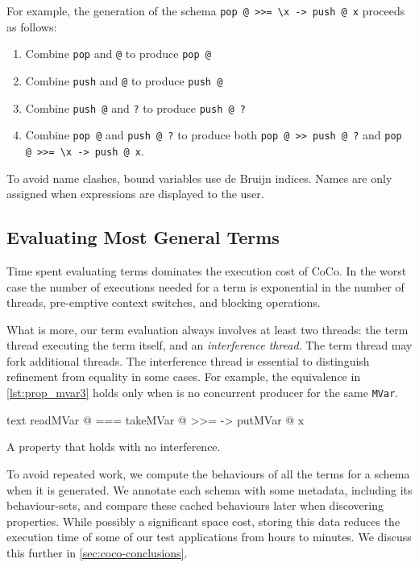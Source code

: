 For example, the generation of the schema
\verb|pop @ >>= \x -> push @ x| proceeds as follows:

\begin{enumerate}
\item Combine \verb|pop| and \verb|@| to produce \verb|pop @|
\item Combine \verb|push| and \verb|@| to produce \verb|push @|
\item Combine \verb|push @| and \verb|?| to produce \verb|push @ ?|
\item Combine \verb|pop @| and \verb|push @ ?| to produce both
  \verb|pop @ >> push @ ?| and \verb|pop @ >>= \x -> push @ x|.
\end{enumerate}

To avoid name clashes, bound variables use de Bruijn
indices\cite{debruijn1972}.  Names are only assigned when expressions
are displayed to the user.

\subsection{Evaluating Most General Terms}
\label{sec:coco-hiw-eval}

Time spent evaluating terms dominates the execution cost of CoCo.  In
the worst case the number of executions needed for a term is
exponential in the number of threads, pre-emptive context switches,
and blocking operations\cite{musuvathi2007}.

What is more, our term evaluation always involves at least two
threads: the term thread executing the term itself, and an
\emph{interference thread}.  The term thread may fork additional
threads.  The interference thread is essential to distinguish
refinement from equality in some cases.  For example, the equivalence
in \cref{lst:prop_mvar3} holds only when is no concurrent producer for
the same \verb|MVar|.

\begin{listing}
\centering
\begin{cminted}{text}
readMVar @  ===  takeMVar @ >>= \x -> putMVar @ x
\end{cminted}
\caption{A property that holds with no interference.}\label{lst:prop_mvar3}
\end{listing}

To avoid repeated work, we compute the behaviours of all the terms for
a schema when it is generated.  We annotate each schema with some
metadata, including its behaviour-sets, and compare these cached
behaviours later when discovering properties.  While possibly a
significant space cost, storing this data reduces the execution time
of some of our test applications from hours to minutes.  We discuss
this further in \cref{sec:coco-conclusions}.

